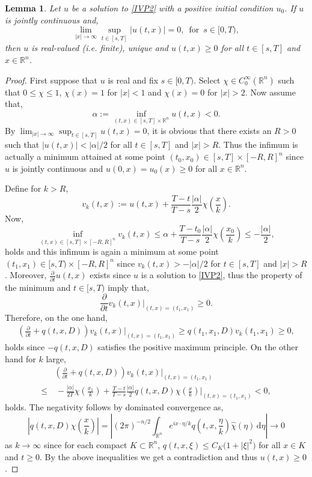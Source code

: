\documentclass[a4paper, 12pt]{report}
\newtheorem{lemma}[theorem]{Lemma}
\theoremstyle{remark}
\theoremstyle{definition}
\begin{document}
\begin{lemma}\label{TDSSoAPL1}
Let $u$ be a solution to \eqref{IVP2} with a positive initial condition $u_0$.  If $u$ is jointly continuous and,
$$
\lim_{|x| \to \infty}\sup_{t \in [s, T]}|u(t, x)| = 0, \,\,\, \text{for} \,\,\, s \in [0, T),
$$
then $u$ is real-valued (i.e. finite), unique and $u(t, x) \ge 0$ for all $t \in [s, T]$ and $x \in \mathbb{R}^n$.
\end{lemma}
\begin{proof}
First suppose that $u$ is real and fix $s \in [0, T)$.  Select $\chi \in C_0^\infty(\mathbb{R}^n)$ such that $0 \le \chi \le 1$, $\chi(x) = 1$ for $|x| < 1$ and $\chi(x) = 0$ for $|x| > 2$.  Now assume that,
$$
\alpha := \inf_{(t, x) \in [s, T] \times \mathbb{R}^n}u(t, x) < 0.
$$
By $\lim_{|x| \to \infty}\sup_{t \in [s, T]}u(t, x) = 0$, it is obvious that there exists an $R > 0$ such that $|u(t, x)| < |\alpha|/2$ for all $t \in [s, T]$ and $|x| > R$.  Thus the infimum is actually a minimum attained at some point $(t_0, x_0) \in [s, T] \times [-R, R]^n$ since $u$ is jointly continuous and $u(0, x) = u_0(x) \ge 0$ for all $x \in \mathbb{R}^n$.

Define for $k > R$,
$$
v_k(t, x) := u(t, x) + \frac{T - t}{T - s}\frac{|\alpha|}{2}\chi\left(\frac{x}{k}\right).
$$
Now,
$$
\inf_{(t, x) \in [s, T] \times [-R, R]^n}v_k(t, x) \le \alpha + \frac{T - t_0}{T - s}\frac{|\alpha|}{2}\chi\left(\frac{x_0}{k}\right) \le -\frac{|\alpha|}{2},
$$
holds and this infimum is again a minimum at some point $(t_1, x_1) \in [s, T) \times [-R, R]^n$ since $v_k(t, x) > -|\alpha|/2$ for $t \in [s, T]$ and $|x| > R$.  Moreover, $\frac{\partial}{\partial t}u(t, x)$ exists since $u$ is a solution to \eqref{IVP2}, thus the property of the minimum and $t \in [s, T)$ imply that,
$$
\frac{\partial}{\partial t}v_k(t, x)\bigg|_{(t, x) = (t_1, x_1)} \ge 0.
$$
Therefore, on the one hand,
$$
\begin{aligned}
\left(\frac{\partial}{\partial t} + q(t, x, D)\right)v_k(t, x)\bigg|_{(t, x) = (t_1, x_1)} \ge q(t_1, x_1, D)v_k(t_1, x_1) \ge 0,
\end{aligned}
$$
holds since $-q(t, x, D)$ satisfies the positive maximum principle.  On the other hand for $k$ large,
$$
\begin{aligned}
& \left(\frac{\partial}{\partial t} + q(t, x, D)\right)v_k(t, x)\bigg|_{(t, x) = (t_1, x_1)}\\
\le & \, -\frac{|\alpha|}{2T}\chi\left(\frac{x_1}{k}\right) + \frac{T - t}{T - s}\frac{|\alpha|}{2}q(t, x, D)\chi\left(\frac{x}{k}\right)\bigg|_{(t, x) = (t_1, x_1)} < 0,
\end{aligned}
$$
holds.  The negativity follows by dominated convergence as,
$$
\left|q(t, x, D)\chi\left(\frac{x}{k}\right)\right| = \left|(2\pi)^{-n/2}\int_{\mathbb{R}^n}e^{ix\cdot\eta/k}q\left(t, x, \frac{\eta}{k}\right)\hat{\chi}(\eta)\,\mathrm{d}\eta\right| \to 0
$$
as $k \to \infty$ since for each compact $K \subset \mathbb{R}^n$, $q(t, x, \xi) \le C_K\big(1 + |\xi|^2\big)$ for all $x \in K$ and $t \ge 0$.  By the above inequalities we get a contradiction and thus $u(t, x) \ge 0$.


\end{proof}
\end{document}
